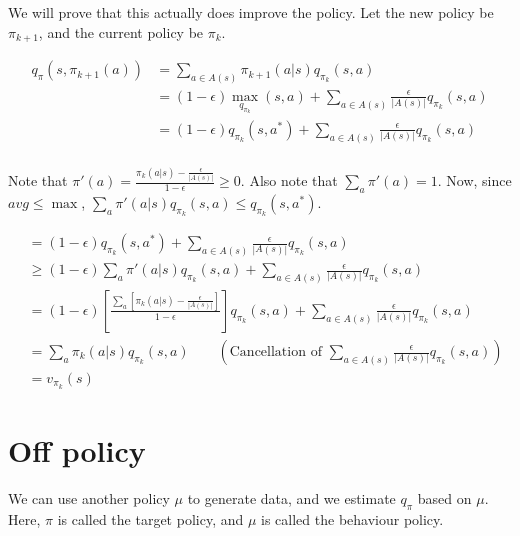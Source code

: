 \documentclass[11pt]{book}
\newcommand{\pik}{{\pi_{k}}}
\newcommand{\piknext}{{\pi_{k+1}}}
\begin{document}
We will prove that this actually does improve the policy. Let the new policy
be $\piknext$, and the current policy be $\pik$.

\begin{align*}
q_\pi(s, \piknext(a)) &= \sum_{a \in A(s) } \piknext(a|s) q_{\pik}(s, a) \\
  &= (1- \epsilon) \max_{q_{\pik}}(s, a) + \sum_{a \in A(s)} \frac{\epsilon}{|A(s)|} q_{\pik}(s, a) \\
  &=  (1- \epsilon) q_{\pik}(s, a^*) + \sum_{a \in A(s)} \frac{\epsilon}{|A(s)|} q_{\pik}(s, a) \\
\end{align*}

Note that $\pi'(a) = \frac{ \pik(a|s) - \frac{\epsilon}{|A(s)|} }{1 - \epsilon} \geq 0$.
Also note that $\sum_a \pi'(a) = 1$. Now, since $avg \leq \max$, $\sum_a \pi'(a|s) q_\pik (s, a) \leq q_\pik(s, a^*)$.

\begin{align*}
  &=  (1- \epsilon) q_{\pik}(s, a^*) + \sum_{a \in A(s)} \frac{\epsilon}{|A(s)|} q_{\pik}(s, a) \\
  &\geq  (1- \epsilon) \sum_a \pi'(a|s) q_{\pik}(s, a) + 
         \sum_{a \in A(s)} \frac{\epsilon}{|A(s)|} q_{\pik}(s, a) \\
  &= (1- \epsilon) \left[ \frac{\sum_a \left[ \pik(a|s) - \frac{\epsilon}{|A(s)|} \right] }{1 - \epsilon} \right] q_{\pik}(s, a) + 
         \sum_{a \in A(s)} \frac{\epsilon}{|A(s)|} q_{\pik}(s, a) \\
  &= \sum_a \pik(a|s) q_\pik(s, a) \qquad \left( \text{Cancellation of $\sum_{a \in A(s)} \frac{\epsilon}{|A(s)|} q_{\pik}(s, a)$} \right) \\
  &= v_\pik(s)
\end{align*}


\section{Off policy}

We can use another policy $\mu$ to generate data, and we estimate $q_{\pi}$ based on $\mu$.
Here, $\pi$ is called the target policy, and $\mu$ is called the behaviour policy.
\end{document}
